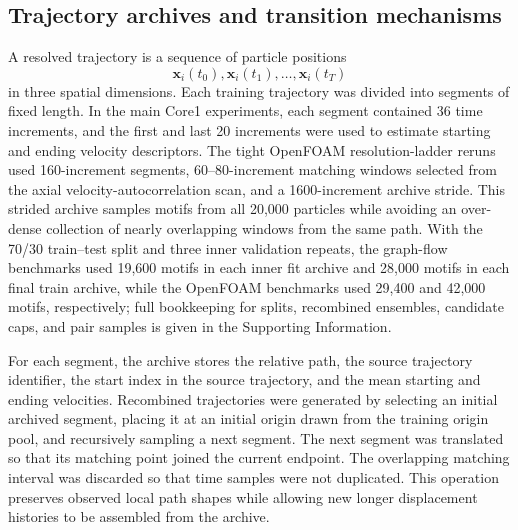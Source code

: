\documentclass[11pt]{article}
\begin{document}
\subsection{Trajectory archives and transition mechanisms}

A resolved trajectory is a sequence of particle positions
\[
  \mathbf{x}_i(t_0), \mathbf{x}_i(t_1), \ldots, \mathbf{x}_i(t_T)
\]
in three spatial dimensions. Each training trajectory was divided into segments of fixed length. In the main Core1 experiments, each segment contained 36 time increments, and the first and last 20 increments were used to estimate starting and ending velocity descriptors. The tight OpenFOAM resolution-ladder reruns used 160-increment segments, 60--80-increment matching windows selected from the axial velocity-autocorrelation scan, and a 1600-increment archive stride. This strided archive samples motifs from all 20,000 particles while avoiding an over-dense collection of nearly overlapping windows from the same path. With the 70/30 train--test split and three inner validation repeats, the graph-flow benchmarks used 19,600 motifs in each inner fit archive and 28,000 motifs in each final train archive, while the OpenFOAM benchmarks used 29,400 and 42,000 motifs, respectively; full bookkeeping for splits, recombined ensembles, candidate caps, and pair samples is given in the Supporting Information.

For each segment, the archive stores the relative path, the source trajectory identifier, the start index in the source trajectory, and the mean starting and ending velocities. Recombined trajectories were generated by selecting an initial archived segment, placing it at an initial origin drawn from the training origin pool, and recursively sampling a next segment. The next segment was translated so that its matching point joined the current endpoint. The overlapping matching interval was discarded so that time samples were not duplicated. This operation preserves observed local path shapes while allowing new longer displacement histories to be assembled from the archive.
\end{document}
